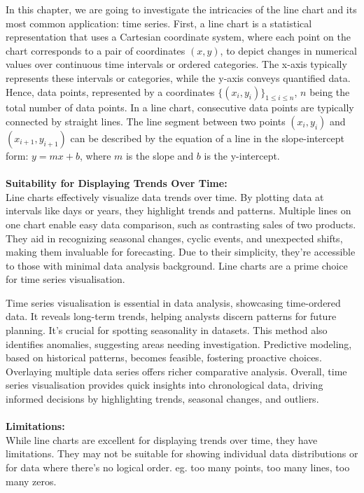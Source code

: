\documentclass{article}\usepackage[]{graphicx}\usepackage[]{xcolor}
\begin{document}
In this chapter, we are going to investigate the intricacies of the line chart and its most common application: time series. 
First, a line chart is a statistical representation that uses a Cartesian coordinate system, where each point on the chart corresponds to a pair of coordinates $(x,y)$, to depict changes in numerical values over continuous time intervals or ordered categories. The x-axis typically represents these intervals or categories, while the y-axis conveys quantified data. Hence, data points, represented by a coordinates $\{(x_i,y_i)\}_{1 \leq i \leq n}$, $n$ being the total number of data points. In a line chart, consecutive data points are typically connected by straight lines. The line segment between two points $(x_i,y_i)$ and $(x_{i+1},y_{i+1})$ can be described by the equation of a line in the slope-intercept form: $y=mx+b$, where $m$ is the slope and $b$ is the y-intercept.\\\\
\textbf{Suitability for Displaying Trends Over Time:}\\
Line charts effectively visualize data trends over time. By plotting data at intervals like days or years, they highlight trends and patterns. Multiple lines on one chart enable easy data comparison, such as contrasting sales of two products. They aid in recognizing seasonal changes, cyclic events, and unexpected shifts, making them invaluable for forecasting. Due to their simplicity, they're accessible to those with minimal data analysis background. Line charts are a prime choice for time series visualisation.

Time series visualisation is essential in data analysis, showcasing time-ordered data. It reveals long-term trends, helping analysts discern patterns for future planning. It's crucial for spotting seasonality in datasets. This method also identifies anomalies, suggesting areas needing investigation. Predictive modeling, based on historical patterns, becomes feasible, fostering proactive choices. Overlaying multiple data series offers richer comparative analysis. Overall, time series visualisation provides quick insights into chronological data, driving informed decisions by highlighting trends, seasonal changes, and outliers.\\\\
\textbf{Limitations:}\\
While line charts are excellent for displaying trends over time, they have limitations. They may not be suitable for showing individual data distributions or for data where there's no logical order. eg. too many points, too many lines, too many zeros.
\end{document}
